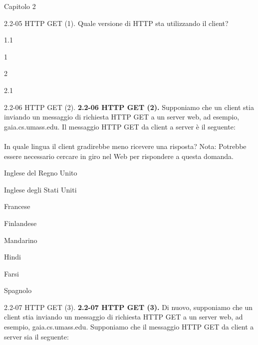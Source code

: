 \documentclass[11pt]{article}
\begin{document}
\begin{quiz}{Capitolo 2}
\begin{multi}[points=1,shuffle]{2.2-05 HTTP GET (1).}
Quale versione di HTTP sta utilizzando il client?
\item* 1.1
\item 1
\item 2
\item 2.1
\end{multi}
            

\begin{multi}[points=1,shuffle]{2.2-06 HTTP GET (2).}
\textbf{2.2-06 HTTP GET (2).}
Supponiamo che un client stia inviando un messaggio di richiesta HTTP GET a un server web, ad esempio, gaia.cs.umass.edu. Il messaggio HTTP GET da client a server è il seguente: \\

\\

In quale lingua il client gradirebbe meno ricevere una risposta?
Nota: Potrebbe essere necessario cercare in giro nel Web per rispondere a questa domanda.
\item* Inglese del Regno Unito
\item Inglese degli Stati Uniti
\item Francese
\item Finlandese
\item Mandarino
\item Hindi
\item Farsi
\item Spagnolo
\end{multi}

\begin{multi}[points=1,shuffle]{2.2-07 HTTP GET (3).}
\textbf{2.2-07 HTTP GET (3).}
Di nuovo, supponiamo che un client stia inviando un messaggio di richiesta HTTP GET a un server web, ad esempio, gaia.cs.umass.edu. Supponiamo che il messaggio HTTP GET da client a server sia il seguente: \\


\end{multi}
\end{quiz}
\end{document}

